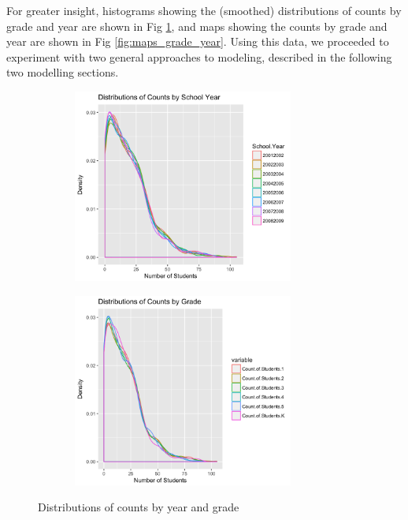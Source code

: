 \documentclass[journal]{IEEEtran}
\begin{document}
For greater insight, histograms showing the (smoothed) distributions of counts by grade and year are shown in Fig \ref{fig:hists_grade_year}, and maps showing the counts by grade and year are shown in Fig \ref{fig:maps_grade_year}. Using this data, we proceeded to experiment with two general approaches to modeling, described in the following two modelling sections.

\begin{figure}
\centering
\begin{subfigure}
  \centering
  \includegraphics[width=3in,height=2.5in,clip,keepaspectratio]{year_distribution.png}
\end{subfigure}
\begin{subfigure}
  \centering
  \includegraphics[width=3in,height=2.5in,clip,keepaspectratio]{grade_distribution.png}
\end{subfigure}
\caption{Distributions of counts by year and grade}
\label{fig:hists_grade_year}
\end{figure}
\end{document}
